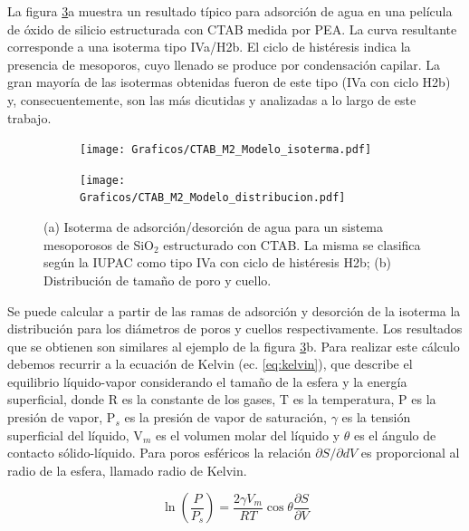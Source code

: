 		La figura \ref{fig:pea_ej}a muestra un resultado típico para adsorción de agua en una película de óxido de silicio estructurada con CTAB medida por PEA. La curva resultante corresponde a una isoterma tipo IVa/H2b. El ciclo de histéresis indica la presencia de mesoporos, cuyo llenado se produce por condensación capilar. \cite{Gregg1967}La gran mayoría de las isotermas obtenidas fueron de este tipo (IVa con ciclo H2b) y, consecuentemente, son las más dicutidas y analizadas a lo largo de este trabajo. 

			\begin{figure}[!ht]
		     	  		\begin{subfigure}[t]{0.491\textwidth}
		     	  		\texttt{[image: Graficos/CTAB\_M2\_Modelo\_isoterma.pdf]}
						\label{fig:pea_ej1}
						\end{subfigure}
						\begin{subfigure}[t]{0.495\textwidth}
		     	  		\texttt{[image: Graficos/CTAB\_M2\_Modelo\_distribucion.pdf]}
						\label{fig:pea_ej2}
						\end{subfigure}
						\vspace*{-0.6cm}
						\caption[Isoterma de adsorción/desorción tipo IVa, H2b.]{(a) Isoterma de adsorción/desorción de agua para un sistema mesoporosos de SiO$_2$ estructurado con CTAB. La misma se clasifica según la IUPAC como tipo IVa con ciclo de histéresis H2b; (b) Distribución de tamaño de poro y cuello.}
						\label{fig:pea_ej}
						\end{figure}			
		
		Se puede calcular a partir de las ramas de adsorción y desorción de la isoterma la distribución para los diámetros de poros y cuellos respectivamente. Los resultados que se obtienen son similares al ejemplo de la figura \ref{fig:pea_ej}b. Para realizar este cálculo debemos recurrir a la ecuación de Kelvin (ec. \ref{eq:kelvin}), que describe el equilibrio líquido-vapor considerando el tamaño de la esfera y la energía superficial, donde R es la constante de los gases, T es la temperatura, P es la presión de vapor, P$_s$ es la presión de vapor de saturación, $\gamma$ es la tensión superficial del líquido, V$_m$ es el volumen molar del líquido y $\theta$ es el ángulo de contacto sólido-líquido. \cite{Baklanov2000,Boissiere2005,Sing1985} Para poros esféricos la relación $\partial S/ \partial dV$ es proporcional al radio de la esfera, llamado radio de Kelvin.\cite{FernandezPrini2005}
		
			\begin{equation}
			  	 \ln \left(\frac{P}{P_s}\right)=\frac{2\gamma V_m}{RT} \cos{\theta}\frac{\partial S}{\partial V}
			     \label{eq:kelvin}
			 	 \end{equation}					
	
